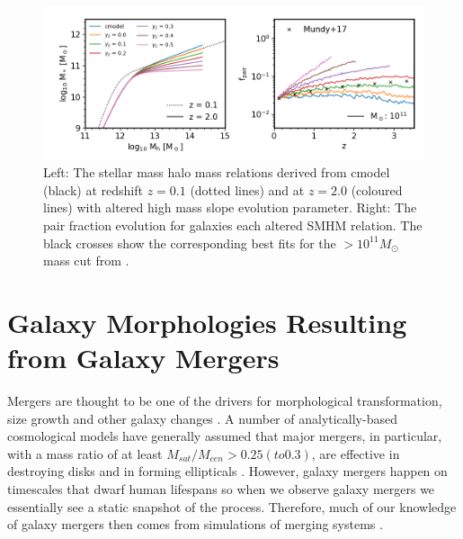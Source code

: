 \begin{figure}
	\centering
	\includegraphics[width = \linewidth]{Figures/Chapter5/PairFractionHMevo.png}
    \caption{Left: The stellar mass halo mass relations derived from cmodel (black) at redshift $z = 0.1$ (dotted lines) and at $z = 2.0$ (coloured lines) with altered high mass slope evolution parameter. Right: The pair fraction evolution for galaxies each altered SMHM relation. The black crosses show the corresponding best fits for the $>10^{11}M_{\odot}$ mass cut from \citet{Mundy2017A3.5}.}
	\label{fig:PairFractionHMevo}
\end{figure}

\section{Galaxy Morphologies Resulting from Galaxy Mergers}

Mergers are thought to be one of the drivers for morphological transformation, size growth and other galaxy changes \citep{Bournaud2007, Hopkins2009TheDemographics, Hopkins2010MergersFunctions, Shankar2011SizeUniverse, Fontanot2015OnMergers}. A number of analytically-based cosmological models have generally assumed that major mergers, in particular, with a mass ratio of at least $M_{sat}/M_{cen} > 0.25(to 0.3)$, are effective in destroying disks and in forming ellipticals \citep{Baugh2006AApproach, Malbon2007BlackFormation, Bower2010TheFormation}. However, galaxy mergers happen on timescales that dwarf human lifespans so when we observe galaxy mergers we essentially see a static snapshot of the process. Therefore, much of our knowledge of galaxy mergers then comes from simulations of merging systems \cite[e..g.][]{Hopkins2006ASpheroids,Hopkins2009TheDemographics, Hopkins2010MergersRate,Hopkins2009HOWMERGERS,Hopkins2010MERGERSMATTER,OLeary2020EMERGE:zsim6,Fensch2017High-redshiftFormation,Stewart2008MergerSurvival,Stewart2009GALAXYDEPENDENCE}. 


